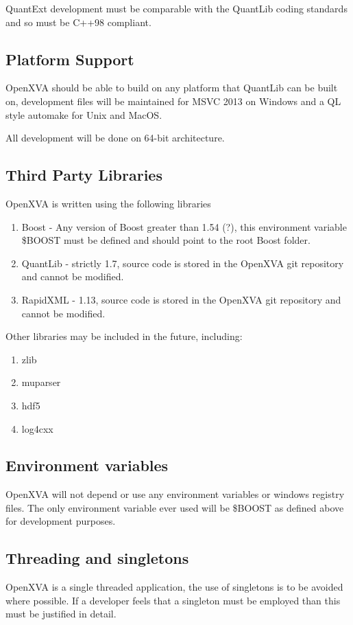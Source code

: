 \documentclass[12pt, a4paper]{article}
\begin{document}
QuantExt development must be comparable with the QuantLib coding standards and so must be C++98 compliant.

\subsection*{Platform Support}
OpenXVA should be able to build on any platform that QuantLib can be built on, development files will be maintained for MSVC 2013 on Windows and a QL style automake for Unix and MacOS.

All development will be done on 64-bit architecture.

\subsection*{Third Party Libraries}
OpenXVA is written using the following libraries
\begin{enumerate}
\item Boost - Any version of Boost greater than 1.54 (?), this environment variable \$BOOST must be defined and should point to the root Boost folder.
\item QuantLib - strictly 1.7, source code is stored in the OpenXVA git repository and cannot be modified.
\item RapidXML - 1.13, source code is stored in the OpenXVA git repository and cannot be modified.
\end{enumerate}
Other libraries may be included in the future, including:
\begin{enumerate}
\item zlib
\item muparser
\item hdf5
\item log4cxx
\end{enumerate}

\subsection*{Environment variables}
OpenXVA will not depend or use any environment variables or windows registry files. The only environment variable ever used will be \$BOOST as defined above for development purposes.

\subsection*{Threading and singletons}
OpenXVA is a single threaded application, the use of singletons is to be avoided where possible. If a developer feels that a singleton must be employed than this must be justified in detail.
\end{document}
